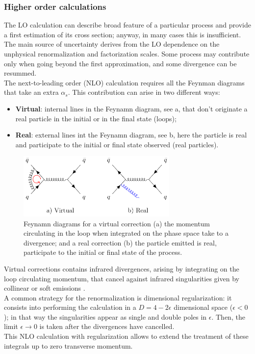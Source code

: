 \subsubsection{Higher order calculations}

The LO calculation can describe broad feature of a particular process and provide a first estimation of its cross section; anyway, in many cases this is insufficient.
\\
The main source of uncertainty derives from the LO dependence  on the unphysical renormalization and factorization scales. Some process may contribute only when going beyond the first approximation, and some divergence can be resummed. 
\\
The next-to-leading order (NLO) calculation requires all the Feynman diagrams that take an extra $\alpha_s$. This contribution can arise in two different ways:
\begin{itemize}
	\item \textbf{Virtual}: internal lines in the Feynamn diagram, see a, that don't originate a real particle in the initial or in the final state (loops);
	\item \textbf{Real}: external lines int the Feynamn diagram, see b, here the particle is real and participate to the initial or final state observed (real particles).
\end{itemize}
\begin{figure}[!htb]
	\centering
	\includegraphics[width=0.7\textwidth]{img/feynman_Real_Virtual.pdf}
	\caption{Feynamn diagrams for a virtual correction (a) the momentum circulating in the loop when integrated on the phase space take to a divergence; and a real correction (b) the particle emitted is real, participate to the initial or final state of the process.}
	\label{fig:feynman_Real_Virtual}
\end{figure}

Virtual corrections contains infrared divergences, arising by integrating on the loop circulating momentum, that cancel against infrared singularities given by collinear  or soft emissions \cite{PhysRevBloch, KinoshitaToichiro, PhysRevLee}. 
\\
A common strategy for the renormalization is dimensional regularization: it consists into performing the calculation in a $D=4-2\epsilon$ dimensional space ($\epsilon<0$); in that way the singularities appear as single and double poles in $\epsilon$. Then, the limit $\epsilon\rightarrow0$ is taken after the divergences have cancelled.
\\
This NLO calculation with regularization allows to extend the treatment of these integrals up to zero transverse momentum.


